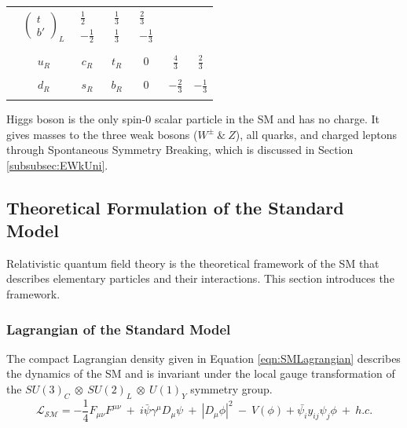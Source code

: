 \begin{table}
\begin{center}
\begin{tabular}{| c | c | c | c | c | c | c |}
                     &$\begin{pmatrix}  t \\ b{'} \end{pmatrix}_{L}$  
                    &$\begin{matrix} \frac{1}{2} \\[0.15cm] -\frac{1}{2} \end{matrix}$
                    &$\begin{matrix} \frac{1}{3} \\[0.15cm] \frac{1}{3} \end{matrix}$
                    &$\begin{matrix} \frac{2}{3} \\[0.15cm] -\frac{1}{3} \end{matrix}$\\
                & & & & & & \\
                    & $u_{R}$ & $c_{R}$ &  $t_{R}$ & $0$ & $\frac{4}{3}$  & $\frac{2}{3}$ \\
                    & & & & & & \\
                    & $d_{R}$ & $s_{R}$ &  $b_{R}$ & $0$ & $-\frac{2}{3}$  & $-\frac{1}{3}$ \\
& & & & & & \\
\hline
\end{tabular}
\label{tab:Fermions}
\end{center}
\end{table}

Higgs boson is the only spin-0 scalar particle in the SM and has no charge. It gives masses to the three weak bosons ($W^{\pm} ~\&~ Z$), all quarks, and charged leptons through Spontaneous Symmetry Breaking, which is discussed in Section \ref{subsubsec:EWkUni}.

\subsection{Theoretical Formulation of the Standard Model}
\label{subsec:TheoryFormulation}

Relativistic quantum field theory is the theoretical framework of the SM that describes elementary particles and their interactions. This section introduces the framework. 

\subsubsection{Lagrangian of the Standard Model}
\label{subsubsec:SMLag}
The compact Lagrangian density given in Equation \ref{eqn:SMLagrangian} describes the dynamics of the SM and is invariant under the local gauge transformation of the $SU(3)_{C}~\otimes~SU(2)_{L}~\otimes~U(1)_{Y}$ symmetry group. 
\begin{equation}
\mathcal{L_{SM}} = -\frac{1}{4}F_{\mu\nu}F^{\mu\nu} ~+~ i\bar{\psi}\gamma^{\mu}D_{\mu}\psi ~+~ |D_{\mu}\phi|^{2} ~-~V(\phi) + \bar{\psi_{i}}y_{ij}\psi_{j}\phi ~+~ h.c.
\label{eqn:SMLagrangian}
\end{equation}

